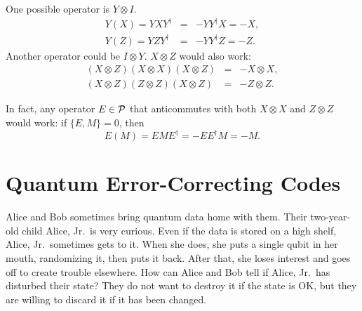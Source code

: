 One possible operator is $Y \otimes I$.
\begin{eqnarray}
Y (X) = Y X Y^\dagger & = & - Y Y^\dagger X = - X, \\
Y (Z) = Y Z Y^\dagger & = & - Y Y^\dagger Z = - Z.
\end{eqnarray}
Another operator could be $I \otimes Y$.  $X \otimes Z$ would also
work:
\begin{eqnarray}
\left(X \otimes Z\right) \left(X \otimes X\right) \left(X \otimes
Z\right) & = & - X \otimes X, \\
\left(X \otimes Z\right) \left(Z \otimes Z\right) \left(X \otimes
Z\right) & = & - Z \otimes Z.
\end{eqnarray}

In fact, any operator $E \in {\cal P}$ that anticommutes with both $X
\otimes X$ and $Z \otimes Z$ would work: if $\{E, M\} = 0$, then
\begin{equation}
E (M) = E M E^\dagger = - E E^\dagger M = - M. \label{anticommute}
\end{equation}

\section{Quantum Error-Correcting Codes}

\begin{example}
Alice and Bob sometimes bring quantum data home with them.  Their
two-year-old child Alice, Jr.\ is very curious.  Even if the data is
stored on a high shelf, Alice, Jr.\ sometimes gets to it.  When she
does, she puts a single qubit in her mouth, randomizing it, then puts
it back.  After that, she loses interest and goes off to create
trouble elsewhere.  How can Alice and Bob tell if Alice, Jr.\ has
disturbed their state?  They do not want to destroy it if the state is
OK, but they are willing to discard it if it has been changed.
\end{example}

